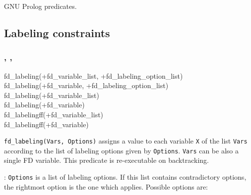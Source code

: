 \Portability

GNU Prolog predicates.

\subsection{Labeling constraints}

\subsubsection{,\label{fd-labeling/2}
               ,
               }

\begin{TemplatesOneCol}
fd\_labeling(+fd\_variable\_list, +fd\_labeling\_option\_list)\\
fd\_labeling(+fd\_variable, +fd\_labeling\_option\_list)\\
fd\_labeling(+fd\_variable\_list)\\
fd\_labeling(+fd\_variable)\\
fd\_labelingff(+fd\_variable\_list)\\
fd\_labelingff(+fd\_variable)

\end{TemplatesOneCol}

\Description

\texttt{fd\_labeling(Vars, Options)} assigns a value to each variable
\texttt{X} of the list \texttt{Vars} according to the list of labeling
options given by \texttt{Options}. \texttt{Vars} can be also a single FD
variable. This predicate is re-executable on backtracking.

: \texttt{Options} is a list of labeling
options. If this list contains contradictory options, the rightmost option
is the one which applies. Possible options are:

